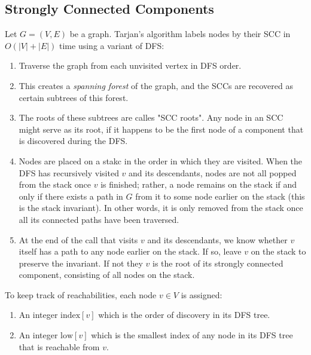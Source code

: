 \documentclass[11pt]{amsart}
\begin{document}
\subsection{Strongly Connected Components} Let $G = (V,E)$ be a graph. Tarjan's algorithm labels nodes by their SCC in $O(|V|+|E|)$ time using a variant of DFS:
\begin{enumerate}[label=(\roman*)]
  \item Traverse the graph from each unvisited vertex in DFS order.
  \item This creates a \emph{spanning forest} of the graph, and the SCCs are recovered as certain subtrees of this forest.
  \item The roots of these subtrees are calles "SCC roots". Any node in an SCC might serve as its root, if it happens to be the first node of a component that is discovered during the DFS.
  \item Nodes are placed on a stakc in the order in which they are visited. When the DFS has recursively visited $v$ and its descendants, nodes are not all popped from the stack once $v$ is finished; rather, a node remains on the stack if and only if there exists a path in $G$ from it to some node earlier on the stack (this is the stack invariant). In other words, it is only removed from the stack once all its connected paths have been traversed.
  \item At the end of the call that visits $v$ and its descendants, we know whether $v$ itself has a path to any node earlier on the stack. If so, leave $v$ on the stack to preserve the invariant. If not they $v$ is the root of its strongly connected component, consisting of all nodes on the stack.
\end{enumerate}
To keep track of reachabilities, each node $v\in V$ is assigned:
\begin{enumerate}[label=(\roman*)]
  \item  An integer $\text{index}[v]$ which is the order of discovery in its DFS tree. 
  \item An integer $\text{low}[v]$ which is the smallest index of any node in its DFS tree that is reachable from $v$.
\end{enumerate}
\end{document}
